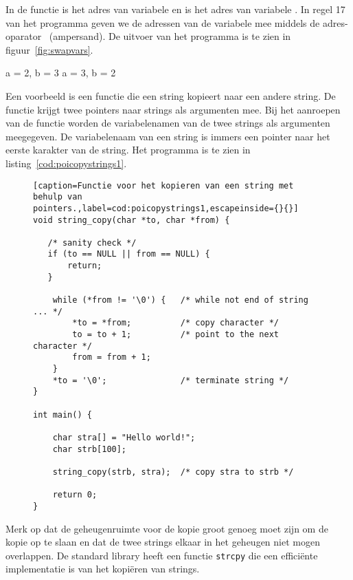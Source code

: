 In de functie  is  het adres van variabele  en is  het adres van variabele . In regel 17 van het programma geven we de adressen van de variabele mee middels de adres-oparator~\lstc{\&} (ampersand).
De uitvoer van het programma is te zien in figuur~\ref{fig:swapvars}. %

\begin{dosbox}[title=Verwisselen van twee variabelen.,label=fig:swapvars]
a = 2, b = 3
a = 3, b = 2
\end{dosbox}

Een voorbeeld is een functie die een string kopieert naar een andere string. De functie krijgt twee pointers naar strings als argumenten mee. Bij het aanroepen van de functie worden de variabelenamen van de twee strings als argumenten meegegeven. De variabelenaam van een string is immers een pointer naar het eerste karakter van de string. Het programma is te zien in listing~\ref{cod:poicopystrings1}.

\begin{figure}[!ht]
\begin{lstlisting}[caption=Functie voor het kopieren van een string met behulp van pointers.,label=cod:poicopystrings1,escapeinside={}{}]
void string_copy(char *to, char *from) {

   /* sanity check */
   if (to == NULL || from == NULL) {
       return;
   }

    while (*from != '\0') {   /* while not end of string ... */
        *to = *from;          /* copy character */
        to = to + 1;          /* point to the next character */
        from = from + 1;
    }
    *to = '\0';               /* terminate string */
}

int main() {

    char stra[] = "Hello world!";
    char strb[100];

    string_copy(strb, stra);  /* copy stra to strb */

	return 0;
}
\end{lstlisting}
\end{figure}

Merk op dat de geheugenruimte voor de kopie groot genoeg moet zijn om de kopie op te slaan en dat de twee strings elkaar in het geheugen niet mogen overlappen. De standard library heeft een functie \texttt{strcpy} die een efficiënte implementatie is van het kopiëren van strings.

